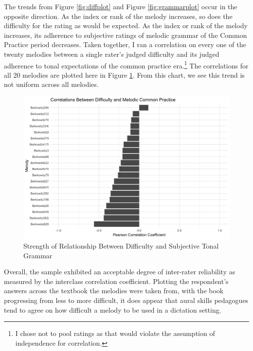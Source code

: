 \documentclass[]{book}
\let\rmarkdownfootnote\footnote%
\def\footnote{\protect\rmarkdownfootnote}
\begin{document}
The trends from Figure \ref{fig:diffplot} and Figure \ref{fig:grammarplot} occur in the opposite direction.
As the index or rank of the melody increases, so does the difficulty for the rating as would be expected.
As the index or rank of the melody increases, its adherence to subjective ratings of melodic grammar of the Common Practice period decreases.
Taken together, I ran a correlation on every one of the twenty melodies between a single rater's judged difficulty and its judged adherence to tonal expectations of the common practice era.\footnote{I chose not to pool ratings as that would violate the assumption of independence for correlation.}
The correlations for all 20 melodies are plotted here in Figure \ref{fig:gramcor}.
From this chart, we see this trend is not uniform across all melodies.

\begin{figure}

{\centering \includegraphics[width=1\linewidth]{img/grammar_difficulty_correlation_plot} 

}

\caption{Strength of Relationship Between Difficulty and Subjective Tonal Grammar}\label{fig:gramcor}
\end{figure}

Overall, the sample exhibited an acceptable degree of inter-rater reliability as measured by the interclass correlation coefficient.
Plotting the respondent's answers across the textbook the melodies were taken from, with the book progressing from less to more difficult, it does appear that aural skills pedagogues tend to agree on how difficult a melody to be used in a dictation setting.
\end{document}
